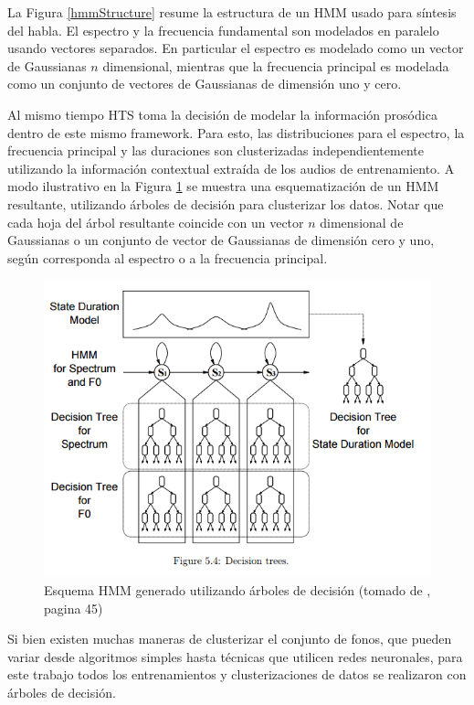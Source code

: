 La Figura \ref{hmmStructure} resume la estructura de un HMM usado para síntesis del habla. El espectro y la frecuencia fundamental son modelados en paralelo usando vectores separados. En particular el espectro es modelado como un vector de Gaussianas $n$ dimensional, mientras que la frecuencia principal es modelada como un conjunto de vectores de Gaussianas de dimensión uno y cero.

Al mismo tiempo HTS toma la decisión de modelar la información prosódica dentro de este mismo framework. Para esto, las distribuciones para el espectro, la frecuencia principal y las duraciones son clusterizadas independientemente utilizando la información contextual extraída de los audios de entrenamiento. A modo ilustrativo en la Figura \ref{hmmTree} se muestra una esquematización de un HMM resultante, utilizando árboles de decisión para clusterizar los datos. Notar que cada hoja del árbol resultante coincide con un vector $n$ dimensional de Gaussianas o un conjunto de vector de Gaussianas de dimensión cero y uno, según corresponda al espectro o a la frecuencia principal.

\begin{figure}
\includegraphics[scale=0.5]{imagenes/hmmContext.png}
\caption{Esquema HMM generado utilizando árboles de decisión (tomado de \cite{phoneticAndProsodic}, pagina 45)}
\label{hmmTree}
\centering
\end{figure}

Si bien existen muchas maneras de clusterizar el conjunto de fonos, que pueden variar desde algoritmos simples hasta técnicas que utilicen redes neuronales, para este trabajo todos los entrenamientos y clusterizaciones de datos se realizaron con árboles de decisión. 


